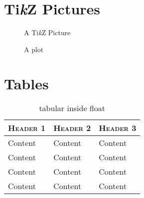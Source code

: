 \documentclass[a4paper,11pt,oneside,showtrims]{alpenthesis}
\begin{document}
\bfseries\ttfamily\lipsum[5]

\normalfont\scshape\lipsum[6]

\slshape\lipsum[7]

\scshape\lipsum[8]

\scslshape\lipsum[9]

\normalfont

\chapter{Ti\emph{k}Z Pictures}
\begin{figure}
    \centering
    \caption{A Ti\emph{k}Z Picture}
\end{figure}

\begin{figure}
    \centering
    \caption{A plot}
\end{figure}

\chapter{Tables}
\begin{table}
    \centering
    \caption{tabular inside float}
    \label{tab:float}
    \begin{tabular}{lll}
        \toprule
        \scshape Header 1 & \scshape Header 2 & \scshape Header 3 \\
        \midrule
        Content           & Content           & Content           \\
        Content           & Content           & Content           \\
        Content           & Content           & Content           \\
        Content           & Content           & Content           \\
        \bottomrule
    \end{tabular}
\end{table}
\end{document}
